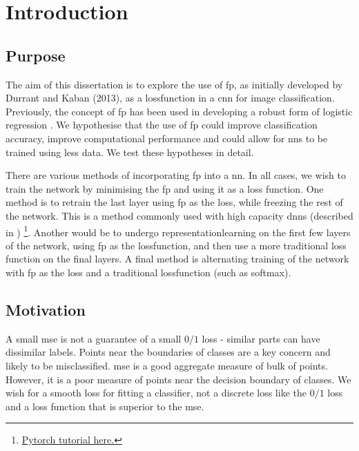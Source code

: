 \chapter{Introduction}

\section{Purpose}

The aim of this dissertation is to explore the use of  \gls{fp}, as initially developed by Durrant and Kaban (2013)\cite{durrant2013sharp}, as a \gls{lossfunction} in a \gls{cnn} for image classification. Previously, the concept of  \gls{fp} has been used in developing a robust form of logistic regression \cite{label_noise}. We hypothesise that the use of  \gls{fp} could improve classification accuracy, improve computational performance and could allow for \gls{nn}s to be trained using less data. We test these hypotheses in detail. \bigskip

There are various methods of incorporating  \gls{fp} into a  \gls{nn}. In all cases, we wish to train the network by minimising the \gls{fp} and using it as a loss function. One method is to retrain the last layer using  \gls{fp} as the loss, while freezing the rest of the network. This is a method commonly used with high capacity \gls{dnn}s (described in \cite{transfer_learning}) \footnote{\href{https://pytorch.org/tutorials/beginner/transfer_learning_tutorial.html}{Pytorch tutorial here.}}. Another would be to undergo \gls{representationlearning} on the first few \gls{layer}s of the network, using  \gls{fp} as the \gls{lossfunction}, and then use a more traditional loss function on the final layers. A final method is alternating training of the network with  \gls{fp} as the \gls{loss} and a traditional \gls{lossfunction} (such as \gls{softmax}). 

\section{Motivation}

A small  \gls{mse} is not a guarantee of a small $0/1$ loss - similar parts can have dissimilar labels. Points near the boundaries of classes are a key concern and likely to be misclassified.  \gls{mse} is a good aggregate measure of bulk of points. However, it is a poor measure of points near the decision boundary of classes. We wish for a smooth loss for fitting a classifier, not a discrete loss like the $0/1$ loss and a loss function that is superior to the  \gls{mse}.

